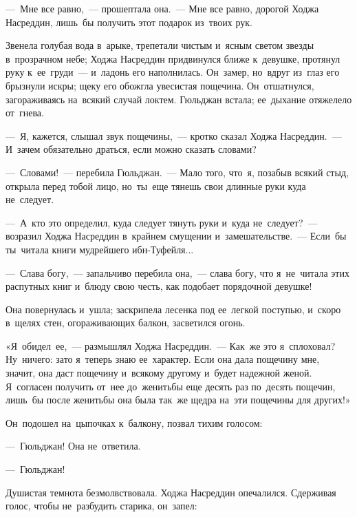 \documentclass[12pt,a4paper]{book}
\begin{document}
—~Мне все равно,~— прошептала она.~— Мне все равно, дорогой Ходжа Насреддин, лишь~бы получить этот подарок из~твоих рук.

Звенела голубая вода в~арыке, трепетали чистым и~ясным светом звезды в~прозрачном небе; Ходжа Насреддин придвинулся ближе к~девушке, протянул руку к~ее~груди~— и~ладонь его наполнилась. Он~замер, но~вдруг из~глаз его брызнули искры; щеку его обожгла увесистая пощечина. Он~отшатнулся, загораживаясь на~всякий случай локтем. Гюльджан встала; ее~дыхание отяжелело от~гнева.

—~Я, кажется, слышал звук пощечины,~— кротко сказал Ходжа Насреддин.~— И~зачем обязательно драться, если можно сказать словами?

—~Словами!~— перебила Гюльджан.~— Мало того, что~я, позабыв всякий стыд, открыла перед тобой лицо, но~ты~еще тянешь свои длинные руки куда не~следует.

—~А~кто это определил, куда следует тянуть руки и~куда не~следует?~— возразил Ходжа Насреддин в~крайнем смущении и~замешательстве.~— Если~бы ты~читала книги мудрейшего ибн-Туфейля...

—~Слава богу,~— запальчиво перебила она,~— слава богу, что я~не~читала этих распутных книг и~блюду свою честь, как подобает порядочной девушке!

Она повернулась и~ушла; заскрипела лесенка под ее~легкой поступью, и~скоро в~щелях стен, огораживающих балкон, засветился огонь.

«Я~обидел~ее,~— размышлял Ходжа Насреддин.~— Как~же это я~сплоховал? Ну~ничего: зато я~теперь знаю ее~характер. Если она дала пощечину мне, значит, она даст пощечину и~всякому другому и~будет надежной женой. Я~согласен получить от~нее до~женитьбы еще десять раз по~десять пощечин, лишь~бы после женитьбы она была так~же щедра на~эти пощечины для других!»

Он~подошел на~цыпочках к~балкону, позвал тихим голосом:

—~Гюльджан! Она не~ответила.

—~Гюльджан!

Душистая темнота безмолвствовала. Ходжа Насреддин опечалился. Сдерживая голос, чтобы не~разбудить старика, он~запел:
\end{document}
